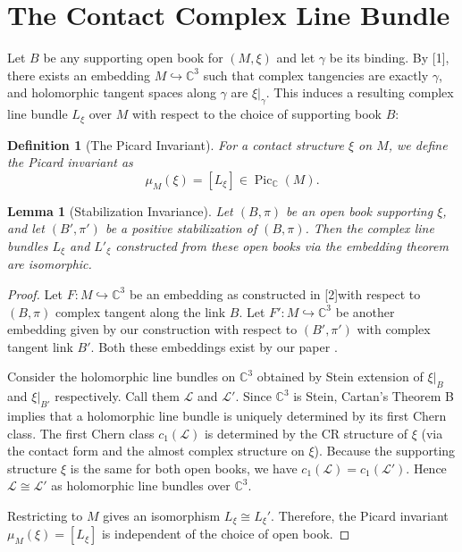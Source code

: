 \documentclass{amsart}
\newtheorem{lemma}[theorem]{Lemma}
\newtheorem{definition}[theorem]{Definition}
\newcommand{\C}{\mathbb{C}}
\newcommand{\Pic}{\operatorname{Pic}}
\begin{document}
\section{The Contact Complex Line Bundle}

Let $B$ be any supporting open book for $(M,\xi)$ and let $\gamma$ be its binding. By [1], there exists an embedding $M \hookrightarrow \C^3$ such that complex tangencies are exactly $\gamma$, and holomorphic tangent spaces along $\gamma$ are $\xi|_\gamma$. This induces a resulting complex line bundle $L_\xi$ over $M$ with respect to the choice of supporting book $B$:

\begin{definition}[The Picard Invariant]
For a contact structure $\xi$ on $M$, we define the Picard invariant as
\[
\mu_M(\xi) = [L_\xi] \in \Pic_{\C}(M).
\]
\end{definition}

\begin{lemma}[Stabilization Invariance]
\label{lem:stab}
Let $(B, \pi)$ be an open book supporting $\xi$, and let $(B', \pi')$ be a positive stabilization of $(B, \pi)$. Then the complex line bundles $L_\xi$ and $L'_\xi$ constructed from these open books via the embedding theorem \cite{Elgindi2025} are isomorphic.
\end{lemma}

\begin{proof}
Let $F: M \hookrightarrow \mathbb{C}^3$ be an embedding as constructed in [2]with respect to $(B,\pi)$ complex tangent along the link $B$. Let $F': M \hookrightarrow \mathbb{C}^3$ be another embedding given by our construction with respect to $(B',\pi')$ with complex tangent link $B'$. Both these embeddings exist by our paper \cite{Elgindi2025}.

Consider the holomorphic line bundles on $\mathbb{C}^3$ obtained by Stein extension of $\xi|_B$ and $\xi|_{B'}$ respectively. Call them $\mathcal{L}$ and $\mathcal{L}'$. Since $\mathbb{C}^3$ is Stein, Cartan's Theorem B implies that a holomorphic line bundle is uniquely determined by its first Chern class. The first Chern class $c_1(\mathcal{L})$ is determined by the CR structure of $\xi$ (via the contact form and the almost complex structure on $\xi$). Because the supporting structure $\xi$ is the same for both open books, we have $c_1(\mathcal{L}) = c_1(\mathcal{L}')$. Hence $\mathcal{L} \cong \mathcal{L}'$ as holomorphic line bundles over $\mathbb{C}^3$.

Restricting to $M$ gives an isomorphism $L_\xi \cong L_\xi'$. Therefore, the Picard invariant $\mu_M(\xi) = [L_\xi]$ is independent of the choice of open book.
\end{proof}
\end{document}
